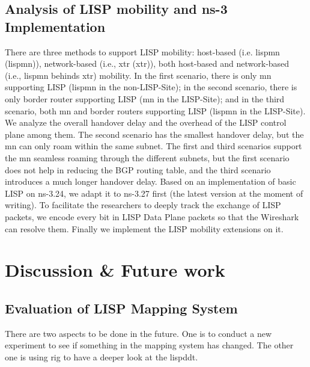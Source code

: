 \subsection{Analysis of LISP mobility and ns-3 Implementation}
There are three methods to support LISP mobility: host-based (i.e. \acrlong{lispmn} (\acrshort{lispmn})), network-based (i.e., \acrlong{xtr} (\acrshort{xtr})), both host-based and network-based (i.e., \acrshort{lispmn} behinds \acrshort{xtr}) mobility. %
In the first scenario, there is only \acrshort{mn} supporting LISP (\acrshort{lispmn} in the non-LISP-Site); in the second scenario, there is only border router supporting LISP (\acrshort{mn} in the LISP-Site); and in the third scenario, both \acrshort{mn} and border routers supporting LISP (\acrshort{lispmn} in the LISP-Site). We analyze the overall handover delay and the overhead of the LISP control plane among them. The second scenario has the smallest handover delay, but the \acrshort{mn} can only roam within the same subnet. The first and third scenarios support the \acrshort{mn} seamless roaming through the different subnets, but the first scenario does not help in reducing the BGP routing table, and the third scenario introduces a much longer handover delay. Based on an implementation of basic LISP on ns-3.24, we adapt it to ns-3.27 first (the latest version at the moment of writing). To facilitate the researchers to deeply track the exchange of LISP packets, we encode every bit in LISP Data Plane packets so that the Wireshark can resolve them. Finally we implement the LISP mobility extensions on it.


\section{Discussion \& Future work}

\subsection{Evaluation of LISP Mapping System}
There are two aspects to be done in the future. One is to conduct a new experiment to see if something in the mapping system has changed. The other one is using \acrfull{rig} to have a deeper look at the \acrfull{lispddt}.

